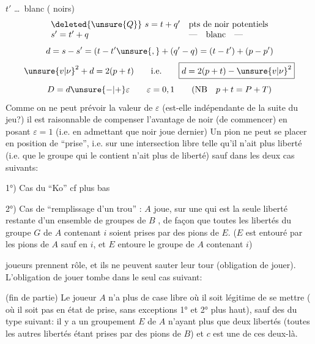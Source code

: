 $t'$ \ldots\ blanc (\text{---} noirs)
\[
\begin{array}{ll}
\deleted{\unsure{Q}}\ s=t+q'&\text{pts de noir potentiels}\\
s'=t'+q&\text{---}\quad\text{blanc}\quad\text{---}
\end{array}
\]
\[
d=s-s'=(t-t'\unsure{,}+(q'-q)=(t-t')+(p-p')
\]
\[
\unsure{v|\nu}^2+d=2(p+t)\qquad\text{i.e.}\qquad\boxed{d=2(p+t)-\unsure{v|\nu}^2}
\]
\[
D=d\unsure{-|+}\varepsilon\qquad\varepsilon=0,1\qquad(\mathrm{NB}\quad p+t=P+T)
\]
Comme on ne peut prévoir la valeur de
$\varepsilon$ (est-elle indépendante de la suite du
jeu?) il est raisonnable de compenser
l'avantage de noir (de commencer)
en posant $\varepsilon=1$ (i.e. en admettant que
noir joue dernier)
Un pion ne peut se placer en position de ``prise'', i.e.
sur une intersection libre telle qu'il n'ait plus
  liberté (i.e. que le groupe qui le contient
n'ait plus de liberté) sauf dans les deux
cas suivants:

1°) Cas du ``Ko'' cf plus bas

2°) Cas de ``remplissage d'un trou'' : 
$A$ joue, sur une   qui est la seule liberté restante
d'un ensemble  de groupes de $B$ , de façon que
toutes les libertés du groupe $G$ de $A$ contenant $i$
soient prises par des pions de $E$. ($E$ est entouré
par les pions de $A$ sauf en $i$, et $E$ entoure
le groupe  de $A$ contenant $i$)


  joueurs prennent   rôle, et ils ne
peuvent sauter leur tour (obligation de jouer).
L'obligation de jouer tombe dans le seul cas
suivant:

(fin de partie) Le joueur $A$ n'a plus de case
libre où il soit légitime de se mettre ( où il
 soit pas en état de prise, sans  exceptions
1° et 2° plus haut), sauf des   du type
suivant: il y a un groupement $E$ de $A$
n'ayant plus que deux libertés  
(toutes les autres libertés étant prises par des
pions de $B$)  et $c$ est une de ces deux-là.

